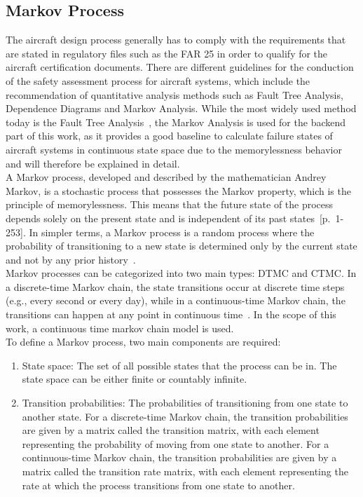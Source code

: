 \subsection{Markov Process}\label{subsec:markov-process}
The aircraft design process generally has to comply with the requirements that are stated in regulatory files such as the \gls{FAR} 25
in order to qualify for the aircraft certification documents.
There are different guidelines for the conduction of the safety assessment process for aircraft systems, which include the
recommendation of quantitative analysis methods such as Fault Tree Analysis, Dependence Diagrams and Markov Analysis.
While the most widely used method today is the Fault Tree Analysis~\cite{7447967}, the Markov Analysis is used for the backend
part of this work, as it provides a good baseline to calculate failure states of aircraft systems in continuous state space due to the memorylessness behavior
and will therefore be explained in detail.
\\
A Markov process, developed and described by the mathematician Andrey Markov, is a stochastic process that possesses the Markov property,
which is the principle of memorylessness.
This means that the future state of the process depends solely on the present state and is independent of its past states~[p.~1-253]\cite{markov-chanis-theory-to-impl}.
In simpler terms, a Markov process is a random process where the probability of transitioning to a new state is determined
only by the current state and not by any prior history~\cite{markov-processes}.
\\
Markov processes can be categorized into two main types:
\gls{DTMC} and \gls{CTMC}.
In a discrete-time Markov chain, the state transitions occur at discrete time steps (e.g., every second or every day),
while in a continuous-time Markov chain, the transitions can happen at any point in continuous time~\cite{markov-processes, VANKAMPEN200773}.
In the scope of this work, a continuous time markov chain model is used.
\\
To define a Markov process, two main components are required:
\begin{enumerate}
    \item State space: The set of all possible states that the process can be in. The state space can be either finite or countably infinite.
    \item Transition probabilities: The probabilities of transitioning from one state to another state. For a discrete-time Markov chain, the transition probabilities are given by a matrix called the transition matrix, with each element representing the probability of moving from one state to another. For a continuous-time Markov chain, the transition probabilities are given by a matrix called the transition rate matrix, with each element representing the rate at which the process transitions from one state to another.
\end{enumerate}
